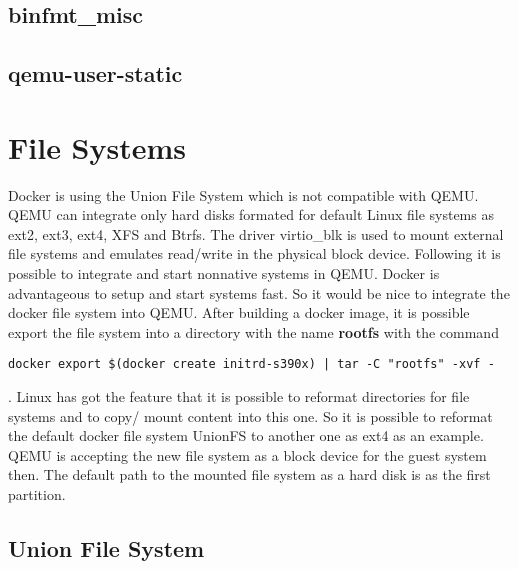 \subsection{binfmt\_misc}

\subsection{qemu-user-static}

\section{File Systems}

Docker is using the Union File System which is not compatible with QEMU.
QEMU can integrate only hard disks formated for default Linux file systems as ext2, ext3, ext4, XFS and Btrfs. 
The driver virtio\_blk is used to mount external file systems and emulates read/write in the physical block device\cite{Barboza2018}. Following it is possible to integrate and start nonnative systems in QEMU. 
Docker is advantageous to setup and start systems fast. 
So it would be nice to integrate the docker file system into QEMU. After building a docker image, it is possible export the file system into a directory with the name \textbf{rootfs} with the command 
\begin{lstlisting}[style=BashInputStyle]
docker export $(docker create initrd-s390x) | tar -C "rootfs" -xvf -
\end{lstlisting}
.
Linux has got the feature that it is possible to reformat directories for file systems and to copy/ mount content into this one. So it is possible to reformat the default docker file system UnionFS to another one as ext4 as an example. \\
QEMU is accepting the new file system as a block device for the guest system then. The default path to the mounted file system as a hard disk is  as the first partition\cite[~p.22]{White2020}.

\subsection{Union File System}

